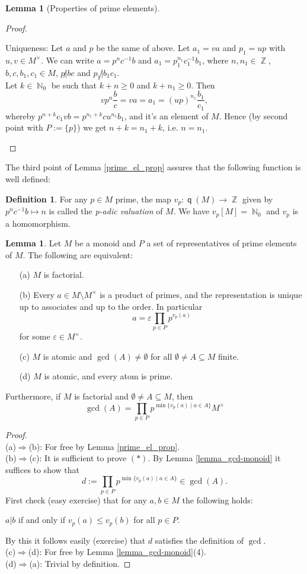 \documentclass[12pt,a4paper]{report}
\theoremstyle{definition}
\newtheorem{lemma}[theorem]{Lemma}
\newtheorem{defn}[theorem]{Definition}
\theoremstyle{num.custom-title}
\DeclareMathOperator{\N}{\mathbb{N}}
\DeclareMathOperator{\Z}{\mathbb{Z}}
\DeclareMathOperator{\imp}{\Rightarrow}
\DeclareMathOperator{\sm}{\setminus}
\DeclareMathOperator{\sse}{\subseteq}
\DeclareMathOperator{\q}{\mathsf{q}}
\renewcommand{\epsilon}{\varepsilon}
\begin{document}
\begin{lemma}[Properties of prime elements]
\begin{proof}
\begin{enumerate}
Uniqueness: Let $a$ and $p$ be the same of above. Let $a_1 = va$ and $p_1=up$ with $u,v \in M^\times$. We can write $a=p^nc^{-1}b$ and $a_1 = p_1^{n_1} c_1^{-1} b_1$, where $n,n_1 \in \Z$, $b,c,b_1,c_1 \in M$, $p \not| bc$ and $p_1 \not| b_1c_1$.\\
Let $k \in \N_0$ be such that $k+n \geq 0$ and $k+n_1 \geq 0$. Then 
\[
vp^n \frac{b}{c} = va = a_1 = (up)^{n_1} \frac{b_1}{c_1},
\]
whereby $p^{n+k} c_1 v b = p^{n_1+k} c u^{n_1} b_1$, and it's an element of $M$. Hence (by second point with $P:=\{p\}$) we get $n+k=n_1+k$, i.e. $n=n_1$.
\end{enumerate}
\end{proof}
\end{lemma}

The third point of Lemma \ref{prime_el_prop} assures that the following function is well defined:

\begin{defn}
For any $p \in M$ prime, the map $v_p : \q(M) \to \Z$ given by $p^n c^{-1} b \mapsto n$ is called the \emph{p-adic valuation} of $M$. We have $v_p[M]=\N_0$ and $v_p$ is a homomorphism.
\end{defn}

\begin{lemma}\label{char_fact_monoids}
Let $M$ be a monoid and $P$ a set of representatives of prime elements of $M$. The following are equivalent:
\begin{enumerate}
\item[(a)] $M$ is factorial.
\item[(b)] Every $a \in M \sm M^\times$ is a product of primes, and the representation is unique up to associates and up to the order. In particular
\[
a = \epsilon \prod_{p \in P} p^{v_p(a)}
\]
for some $\epsilon \in M^\times$.
\item[(c)] $M$ is atomic and $\gcd(A) \neq \emptyset$ for all $\emptyset \neq A \sse M$ finite.
\item[(d)] $M$ is atomic, and every atom is prime.
\end{enumerate}
Furthermore, if $M$ is factorial and $\emptyset \neq A \sse M$, then
\[
\gcd(A) = \prod_{p \in P} p^{\min\{v_p(a) \mid a \in A\}} M^\times \tag{$*$}
\]
\begin{proof}\ \\
(a)$\imp$(b): For free by Lemma \ref{prime_el_prop}.\\
(b)$\imp$(c): It is sufficient to prove $(*)$. By Lemma \ref{lemma_gcd-monoid} it suffices to show that
\[
d := \prod_{p \in P} p^{\min\{v_p(a) \mid a \in A\}} \in \gcd(A).
\]
First check (easy exercise) that for any $a,b \in M$ the following holds:
\begin{center}
$a|b$ if and only if $v_p(a) \leq v_p(b)$ for all $p \in P$.
\end{center}
By this it follows easily (exercise) that $d$ satisfies the definition of $\gcd$.\\
(c)$\imp$(d): For free by Lemma \ref{lemma_gcd-monoid}(4).\\
(d)$\imp$(a): Trivial by definition.
\end{proof}
\end{lemma}
\end{document}
